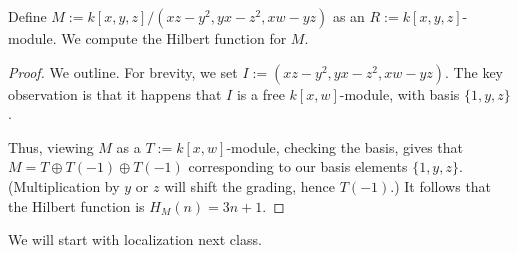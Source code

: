 \documentclass[../notes.tex]{subfiles}
\begin{document}
\begin{exe}[Eisenbud 1.19]
	Define $M:=k[x,y,z]/\left(xz-y^2,yx-z^2,xw-yz\right)$ as an $R:=k[x,y,z]$-module. We compute the Hilbert function for $M$.
\end{exe}
\begin{proof}
	We outline. For brevity, we set $I:=\left(xz-y^2,yx-z^2,xw-yz\right)$. The key observation is that it happens that $I$ is a free $k[x,w]$-module, with basis $\{1,y,z\}$.

	Thus, viewing $M$ as a $T:=k[x,w]$-module, checking the basis, gives that $M=T\oplus T(-1)\oplus T(-1)$ corresponding to our basis elements $\{1,y,z\}$. (Multiplication by $y$ or $z$ will shift the grading, hence $T(-1)$.) It follows that the Hilbert function is $H_M(n)=3n+1$.
\end{proof}
We will start with localization next class.
\end{document}
